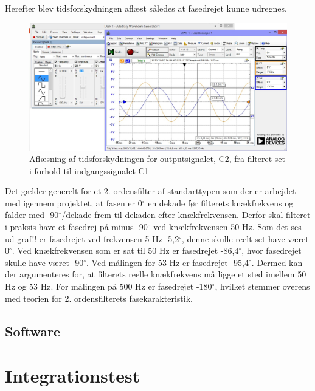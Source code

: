 Herefter blev tidsforskydningen aflæst således at fasedrejet kunne udregnes.
\begin{figure}[H]
	\centering
	\includegraphics[width=1\textwidth]{Figurer/Hardware/AnalogScreenFilter}
	\caption{Aflæsning af tidsforskydningen for outputsignalet, C2, fra filteret set i forhold til indgangssignalet C1}
	\label{fig:FilterTidsforskydning}
\end{figure}
Det gælder generelt for et 2. ordensfilter af standarttypen som der er arbejdet med igennem projektet, at fasen er 0$^{\circ}$ en dekade før filterets knækfrekvens og falder med -90$^{\circ}$/dekade frem til dekaden efter knækfrekvensen. Derfor skal filteret i praksis have et fasedrej på minus -90$^{\circ}$ ved knækfrekvensen 50 Hz. Som det ses ud graf!! er fasedrejet ved frekvensen 5 Hz -5,2$^{\circ}$, denne skulle reelt set have været 0$^{\circ}$. 
Ved knækfrekvensen som er sat til 50 Hz er fasedrejet -86,4$^{\circ}$, hvor fasedrejet skulle have været -90$^{\circ}$. Ved målingen for 53 Hz er fasedrejet -95,4$^{\circ}$. Dermed kan der argumenteres for, at filterets reelle knækfrekvens må ligge et sted imellem 50 Hz og 53 Hz. 
For målingen på 500 Hz er fasedrejet -180$^{\circ}$, hvilket stemmer overens med teorien for 2. ordensfilterets fasekarakteristik.
\subsection{Software}
\section{Integrationstest}
